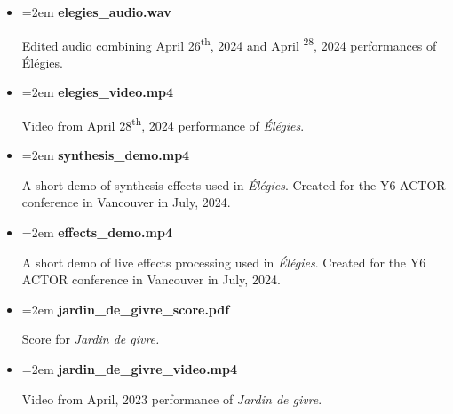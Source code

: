 \documentclass[12pt,twoside,maitrise]{dms_ks}
\theoremstyle{definition}
\begin{document}
{\begin{itemize}
    \item \hangindent=2em \textbf{elegies\_audio.wav}
    \par Edited audio combining April 26\textsuperscript{th}, 2024 and April \textsuperscript{28}, 2024 performances of Élégies.
    
    \item \hangindent=2em \textbf{elegies\_video.mp4}
    \par Video from April 28\textsuperscript{th}, 2024 performance of \textit{Élégies}.
    
    \item \hangindent=2em \textbf{synthesis\_demo.mp4}
    \par A short demo of synthesis effects used in \textit{Élégies}. Created for the Y6 ACTOR conference in Vancouver in July, 2024.
    
    \item \hangindent=2em \textbf{effects\_demo.mp4}
    \par A short demo of live effects processing used in \textit{Élégies}. Created for the Y6 ACTOR conference in Vancouver in July, 2024.

    \item \hangindent=2em \textbf{jardin\_de\_givre\_score.pdf}
    \par Score for \textit{Jardin de givre.}
    
    \item \hangindent=2em \textbf{jardin\_de\_givre\_video.mp4}
    \par Video from April, 2023 performance of \textit{Jardin de givre}.
\end{itemize}



}
\end{document}
